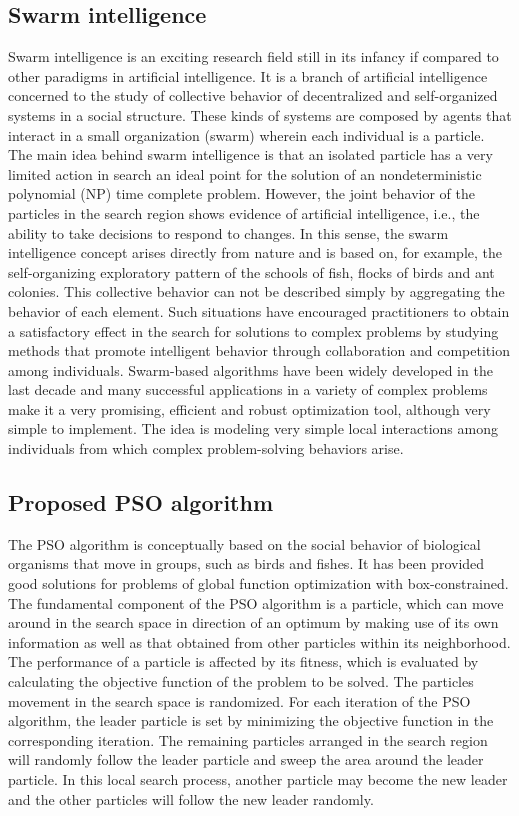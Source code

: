 \documentclass[10pt,letterpaper]{article}
\begin{document}
\subsection{Swarm intelligence}
Swarm intelligence is an exciting research field still in its infancy if compared to other paradigms in artificial intelligence. It is a branch of artificial intelligence concerned to the study of collective behavior of decentralized and self-organized systems in a social structure. These kinds of systems are composed by agents that interact in a small organization (swarm) wherein each individual is a particle. The main idea behind swarm intelligence is that an isolated particle has a very limited action in search an ideal point for the solution of an nondeterministic polynomial (NP) time complete problem. However, the joint behavior of the particles in the search region shows evidence of artificial intelligence, i.e., the ability to take decisions to respond to changes. In this sense, the swarm intelligence concept arises directly from nature and is based on, for example, the self-organizing exploratory pattern of the schools of fish, flocks of birds and ant colonies. This collective behavior can not be described simply by aggregating the behavior of each element. Such situations have  encouraged practitioners to obtain a satisfactory effect in the search for solutions to complex problems by studying methods that promote intelligent behavior through collaboration and competition among individuals. Swarm-based algorithms have been widely developed in the last decade and many successful
applications in a variety of complex problems make it a very promising, efficient and robust optimization tool, although very simple to implement.
The idea is modeling very simple local interactions among individuals from which complex problem-solving behaviors arise.

\subsection{Proposed PSO algorithm}
The PSO algorithm is conceptually based on the social behavior of biological organisms that move in groups, such as birds and fishes. It has been provided good solutions for problems of global function optimization with box-constrained. The fundamental component of the PSO algorithm is a particle, which can move around in the search space in direction of an optimum by making use of its own information as well as that obtained from other particles within its neighborhood. The performance of a particle is affected by its fitness,  which is evaluated by calculating the objective function of the problem to be solved. The particles movement in the search space is randomized. For each iteration of the PSO algorithm, the leader particle is set by minimizing the objective function in the corresponding iteration. The remaining particles arranged in the search region will randomly follow the leader particle and sweep the area around the leader particle. In this local search process, another particle may become the new leader and the other particles will follow the new leader randomly.
\end{document}
